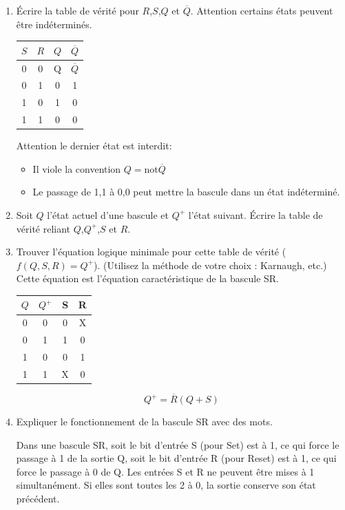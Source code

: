 \documentclass[a4paper,10pt]{exam}
\begin{document}
\begin{enumerate}
  \item Écrire la table de vérité pour $R$,$S$,$Q$ et $\overline{Q}$. Attention
    certains états peuvent être indéterminés.
\begin{solution}
\begin{tabular}{cc|cc}
  $S$&$R$&$Q$&$\overline{Q}$\\
  \hline
  0 & 0  & Q & $\overline{Q}$ \\
  0 & 1  & 0 & 1 \\
  1 & 0  & 1 & 0 \\
  1 & 1  & 0 & 0
\end{tabular}

Attention le dernier état est interdit:
\begin{itemize}
  \item Il viole la convention $Q = \textrm{not} \overline{Q}$
  \item Le passage de 1,1 à 0,0 peut mettre la bascule dans un état indéterminé.
\end{itemize}
\end{solution}


  \item Soit $Q$ l'état actuel d'une bascule et $Q^{+}$ l'état suivant. Écrire
    la table de vérité reliant $Q$,$Q^{+}$,$S$ et $R$.

  \item Trouver l'équation logique minimale pour cette table de vérité
    ($f(Q,S,R) = Q^{+}$). (Utilisez la méthode de votre choix : Karnaugh, etc.)
    Cette équation est l'équation caractéristique de la bascule SR.

\begin{solution}
\begin{tabular}{cc|cc}
  $Q$&$Q^{+}$&S&R\\
  \hline
  0  & 0     &0&X\\
  0  & 1     &1&0\\
  1  & 0     &0&1\\
  1  & 1     &X&0
\end{tabular}
$$ Q^{+} = \overline{R} (Q + S) $$
\end{solution}

  \item Expliquer le fonctionnement de la bascule SR avec des mots.

\begin{solution}
  Dans une bascule SR, soit le bit d'entr\'ee S (pour Set) est \`a 1, ce qui force le passage
  \`a 1 de la sortie Q, soit le bit d'entr\'ee R (pour Reset) est \`a 1, ce qui force le passage
  \`a 0 de Q. Les entr\'ees S et R ne peuvent \^etre mises \`a 1 simultan\'ement. Si elles sont
  toutes les 2 \`a 0, la sortie conserve son \'etat pr\'ec\'edent.
\end{solution}
\end{enumerate}
\end{document}
